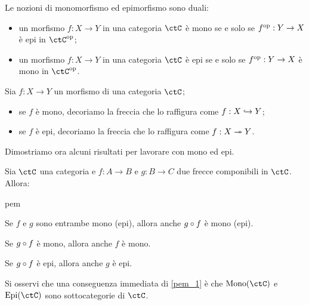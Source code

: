\begin{remark}
	\label{rmk:mono-epi-duality}
	Le nozioni di monomorfismo ed epimorfismo sono duali:
	\begin{itemize}
		\item un morfismo \(f : X\to Y\) in una categoria \(\ctC\) è mono se e solo se \(f^{\text{op}} : Y\to X\) è epi in \(\ctC^{\op}\);
		\item un morfismo \(f : X\to Y\) in una categoria \(\ctC\) è epi se e solo se \(f^{\text{op}} : Y\to X\) è mono in \(\ctC^{\op}\).
	\end{itemize}
\end{remark}
\begin{notation}
	Sia \(f : X\to Y\) un morfismo di una categoria \(\ctC\);
	\begin{itemize}
		\item se \(f\) è mono, decoriamo la freccia che lo raffigura come \(f : X\hookrightarrow Y\);
		\item se \(f\) è epi, decoriamo la freccia che lo raffigura come \(f : X\twoheadrightarrow Y\).
	\end{itemize}
\end{notation}
Dimostriamo ora alcuni risultati per lavorare con mono ed epi.
\begin{proposition}\label{canc_monoepi}
	Sia $\ctC$ una categoria e \(f \colon A \to B\) e \(g \colon B \to C\) due frecce componibili in $\ctC$.
	Allora:
	\begin{enumtag}{pem}
		\item \label{pem_1} Se \(f\) e \(g\) sono entrambe mono (epi), allora anche \(g \circ f\) è mono (epi).
		\item \label{pem_2} Se \(g \circ f\) è mono, allora anche \(f\) è mono.
		\item \label{pem_3} Se \(g \circ f\) è epi, allora anche \(g\) è epi.
	\end{enumtag}
\end{proposition}
Si osservi che una conseguenza immediata di \ref{pem_1} è che $\Mono[\ctC]$ e $\Epi[\ctC]$ sono sottocategorie di $\ctC$.
